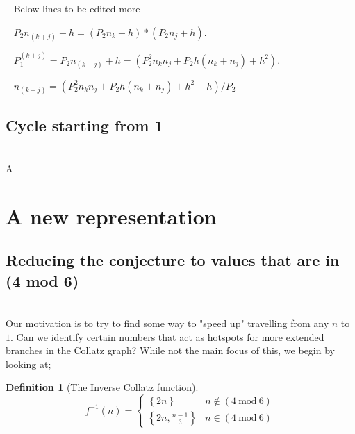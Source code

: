 \documentclass[12pt,a4paper]{amsart}
\numberwithin{equation}{section}
\theoremstyle{plain}
\theoremstyle{definition}
\newtheorem{Def}[Th]{Definition}
\begin{document}
~ Below lines to be edited more ~

~ $P_{2}n_{\left ( k+j \right )} + h = \left ( P_{2}n_{k} + h \right )*\left ( P_{2}n_{j} + h \right )$.

~ $P^{\left ( k+j \right )}_{1} = P_{2}n_{\left ( k+j \right )} + h = \left ( P^{2}_{2}n_{k}n_{j} + P_{2}h\left ( n_{k} + n_{j} \right ) + h^{2} \right )$.

~ $n_{\left ( k+j \right )} = \left ( P^{2}_{2}n_{k}n_{j} + P_{2}h\left ( n_{k} + n_{j} \right ) + h^{2} - h \right ) / P_{2}$

\subsection{Cycle starting from 1} \hfill\\

A

\section{A new representation}

\subsection{Reducing the conjecture to values that are in (4 mod 6)} \hfill\\

Our motivation is to try to find some way to "speed up" travelling from any $n$ to $1$. Can we identify certain numbers that act as hotspots for more extended branches in the Collatz graph? While not the main focus of this, we begin by looking at;

\begin{Def}[The Inverse Collatz function]
\begin{equation}
f^{-1} \left ( n \right )=\left\{\begin{matrix}
\left \{ 2n \right \} & n \notin \left ( 4\:\mathrm{mod}\:6 \right ) \\ 
\left \{ 2n, \frac{n-1}{3} \right \} & n \in \left ( 4\:\mathrm{mod}\:6 \right )
\end{matrix}\right.
\end{equation}
\end{Def}
\end{document}
